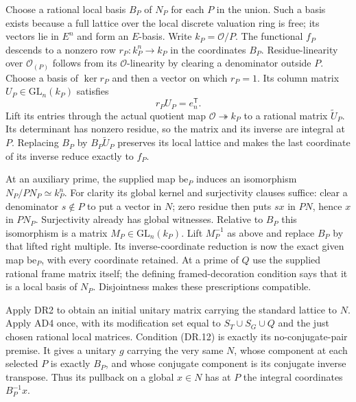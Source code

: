 \documentclass[11pt,a4paper]{article}
\numberwithin{equation}{section}
\theoremstyle{remark}\newtheorem{remark}[theorem]{Remark}
\begin{document}
Choose a rational local basis $B_P$ of $N_P$ for each $P$ in the
union. Such a basis exists because a full lattice over the local
discrete valuation ring is free; its vectors lie in $E^n$ and form
an $E$-basis. Write $k_P=\mathcal O/P$.
The functional $f_P$ descends to a nonzero row
$r_P:k_P^n\to k_P$ in the coordinates $B_P$.
Residue-linearity over $\mathcal O_{(P)}$ follows from its
$\mathcal O$-linearity by clearing a denominator outside $P$.
Choose a basis of $\ker r_P$ and then a vector on which $r_P=1$.
Its column matrix $U_P\in\mathrm{GL}_n(k_P)$ satisfies
\[
                         r_PU_P=e_n^{\mathsf T}.    \tag{DR.13}
\]
Lift its entries through the actual quotient map
$\mathcal O\twoheadrightarrow k_P$ to a rational matrix
$\widetilde U_P$. Its determinant has nonzero residue, so the
matrix and its inverse are integral at $P$. Replacing $B_P$ by
$B_P\widetilde U_P$ preserves its local lattice and makes the last
coordinate of its inverse reduce exactly to $f_P$.

At an auxiliary prime, the supplied map $\mathrm{be}_P$ induces
an isomorphism $N_P/PN_P\simeq k_P^n$.
For clarity its global kernel and surjectivity clauses suffice:
clear a denominator $s\notin P$ to put a vector in $N$;
zero residue then puts $sx$ in $PN$, hence $x$ in $PN_P$.
Surjectivity already has global witnesses. Relative to $B_P$ this
isomorphism is a matrix $M_P\in\mathrm{GL}_n(k_P)$.
Lift $M_P^{-1}$ as above and replace $B_P$ by that lifted
right multiple. Its inverse-coordinate reduction is now the exact
given map $\mathrm{be}_P$, with every coordinate retained.
At a prime of $Q$ use the supplied rational frame matrix itself;
the defining framed-decoration condition says that it is a local
basis of $N_P$. Disjointness makes these prescriptions compatible.

Apply DR2 to obtain an initial unitary matrix carrying the standard
lattice to $N$. Apply AD4 once, with its modification set equal to
$S_T\cup S_G\cup Q$ and the just chosen rational local matrices.
Condition (DR.12) is exactly its no-conjugate-pair premise.
It gives a unitary $g$ carrying the very same $N$, whose component
at each selected $P$ is exactly $B_P$, and whose conjugate component
is its conjugate inverse transpose. Thus its pullback on a global
$x\in N$ has at $P$ the integral coordinates $B_P^{-1}x$.
\end{document}
